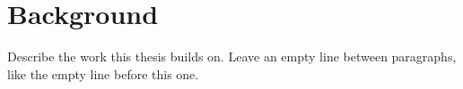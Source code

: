 \chapter{Background}
\label{ch:background}

Describe the work this thesis builds on. Leave an empty line between paragraphs, like the empty
line before this one.
